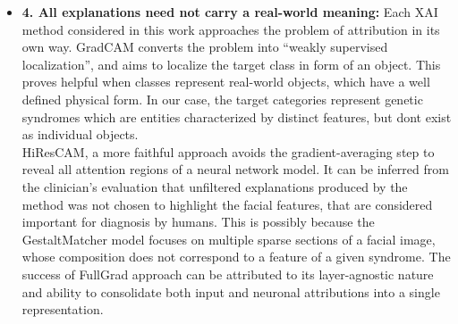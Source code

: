 \documentclass[../report.tex]{subfiles}
\begin{document}
\begin{itemize}
    	\item{\textbf{4. All explanations need not carry a real-world meaning:}} Each XAI method considered in this work approaches the problem of attribution in its own way. GradCAM converts the problem into \enquote{weakly supervised localization}, and aims to localize the target class in form of an object. This proves helpful when classes represent real-world objects, which have a well defined physical form. In our case, the target categories represent genetic syndromes which are entities characterized by distinct features, but dont exist as individual objects.\\ 
    	HiResCAM, a more faithful approach avoids the gradient-averaging step to reveal all attention regions of a neural network model. It can be inferred from the clinician's evaluation that unfiltered explanations produced by the method was not chosen to highlight the facial features, that are considered important for diagnosis by humans. This is possibly because the GestaltMatcher model focuses on multiple sparse sections of a facial image, whose composition does not correspond to a feature of a given syndrome. The success of FullGrad approach can be attributed to its layer-agnostic nature and ability to consolidate both input and neuronal attributions into a single representation. 
    \end{itemize} 
	
\end{document}
